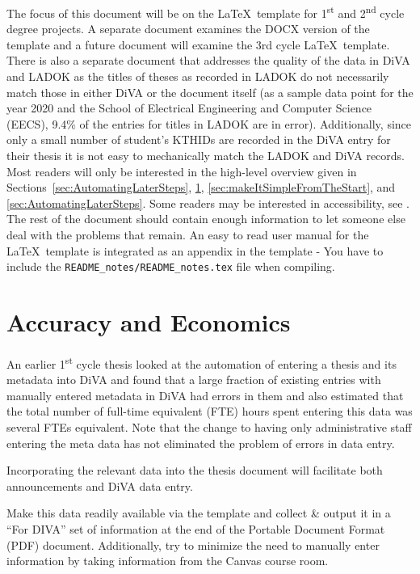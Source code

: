The focus of this document will be on the \LaTeX~template for 1\textsuperscript{st} and 2\textsuperscript{nd} cycle degree projects. A separate document examines the DOCX version of the template and a future document will examine the 3rd cycle \LaTeX~template. There is also a separate document that addresses the quality of the data in DiVA and LADOK as the titles of theses as recorded in LADOK do not necessarily match those in either DiVA or the document itself (as a sample data point for the year 2020 and the School of Electrical Engineering and Computer Science (EECS), 9.4\% of the entries for titles in LADOK are in error). Additionally, since only a small number of student’s KTHIDs are recorded in the DiVA entry for their thesis it is not easy to mechanically match the LADOK and DiVA records.
Most readers will only be interested in the high-level overview given in Sections~\ref{sec:AutomatingLaterSteps}, \ref{sec:accuracyAndEconomics}, \ref{sec:makeItSimpleFromTheStart}, and \ref{sec:AutomatingLaterSteps}. Some readers may be interested in accessibility, see . The rest of the document should contain enough information to let someone else deal with the problems that remain. An easy to read user manual for the \LaTeX~template is integrated as an appendix in the template
{- You have to include the \texttt{README\_notes/README\_notes.tex} file when compiling.}




\section{Accuracy and Economics}
\label{sec:accuracyAndEconomics}

An earlier 1\textsuperscript{st} cycle thesis  looked at the automation of entering a thesis and its metadata into DiVA and found that a large fraction of existing entries with manually entered metadata in DiVA had errors in them and also estimated that the total number of full-time equivalent (FTE) hours spent entering this data was several FTEs equivalent. Note that the change to having only administrative staff entering the meta data has not eliminated the problem of errors in data entry.
\begin{description}[labelwidth =\widthof{\textbf{Hypothesis}}, leftmargin = !]
\item[Hypothesis] Incorporating the relevant data into the thesis document will facilitate both announcements and DiVA data entry.

\item[Approach] Make this data readily available via the template and collect \& output it in a 
“For DIVA” set of information at the end of the Portable Document Format (PDF) document. Additionally, try to minimize the need to manually enter information by taking information from the Canvas course room.
\end{description}

